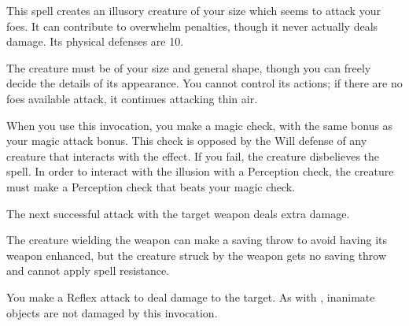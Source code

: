 \spellrng{\rngmed}
\begin{spelleffect}
    This spell creates an illusory creature of your size which seems to attack your foes. It can contribute to overwhelm penalties, though it never actually deals damage. Its physical defenses are 10.

    The creature must be of your size and general shape, though you can freely decide the details of its appearance. You cannot control its actions; if there are no foes available attack, it continues attacking thin air.
\end{spelleffect}
\begin{spellnotes}
    When you use this invocation, you make a magic check, with the same bonus as your magic attack bonus. This check is opposed by the Will defense of any creature that interacts with the effect. If you fail, the creature disbelieves the spell. In order to interact with the illusion with a Perception check, the creature must make a Perception check that beats your magic check.
\end{spellnotes}

\begin{spelleffect}
    The next successful attack with the target weapon deals extra damage.
\end{spelleffect}
\begin{spellnotes} 
    The creature wielding the weapon can make a saving throw to avoid having its weapon enhanced, but the creature struck by the weapon gets no saving throw and cannot apply spell resistance.
\end{spellnotes}

\begin{spelleffect}
    You make a Reflex attack to deal damage to the target. As with , inanimate objects are not damaged by this invocation.
\end{spelleffect}

